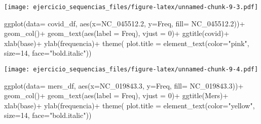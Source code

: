 \documentclass[
]{article}
\newenvironment{Shaded}{\begin{snugshade}}{\end{snugshade}}
\newcommand{\AttributeTok}[1]{\textcolor[rgb]{0.77,0.63,0.00}{#1}}
\newcommand{\DecValTok}[1]{\textcolor[rgb]{0.00,0.00,0.81}{#1}}
\newcommand{\FloatTok}[1]{\textcolor[rgb]{0.00,0.00,0.81}{#1}}
\newcommand{\FunctionTok}[1]{\textcolor[rgb]{0.00,0.00,0.00}{#1}}
\newcommand{\NormalTok}[1]{#1}
\newcommand{\SpecialCharTok}[1]{\textcolor[rgb]{0.00,0.00,0.00}{#1}}
\newcommand{\StringTok}[1]{\textcolor[rgb]{0.31,0.60,0.02}{#1}}
\begin{document}
\texttt{[image: ejercicio\_sequencias\_files/figure-latex/unnamed-chunk-9-3.pdf]}

\begin{Shaded}
\begin{Highlighting}[]
\FunctionTok{ggplot}\NormalTok{(}\AttributeTok{data=}\NormalTok{ covid\_df, }\FunctionTok{aes}\NormalTok{(}\AttributeTok{x=}\NormalTok{NC\_045512}\FloatTok{.2}\NormalTok{, }\AttributeTok{y=}\NormalTok{Freq, }\AttributeTok{fill=}\NormalTok{ NC\_045512}\FloatTok{.2}\NormalTok{))}\SpecialCharTok{+}
   \FunctionTok{geom\_col}\NormalTok{()}\SpecialCharTok{+}
   \FunctionTok{geom\_text}\NormalTok{(}\FunctionTok{aes}\NormalTok{(}\AttributeTok{label =}\NormalTok{ Freq), }\AttributeTok{vjust =} \DecValTok{0}\NormalTok{)}\SpecialCharTok{+}
   \FunctionTok{ggtitle}\NormalTok{(}\StringTok{\textquotesingle{}covid\textquotesingle{}}\NormalTok{)}\SpecialCharTok{+}
   \FunctionTok{xlab}\NormalTok{(}\StringTok{\textquotesingle{}base\textquotesingle{}}\NormalTok{)}\SpecialCharTok{+}
   \FunctionTok{ylab}\NormalTok{(}\StringTok{\textquotesingle{}frequencia\textquotesingle{}}\NormalTok{)}\SpecialCharTok{+}
   \FunctionTok{theme}\NormalTok{(}
   \AttributeTok{plot.title =}  \FunctionTok{element\_text}\NormalTok{(}\AttributeTok{color=}\StringTok{"pink"}\NormalTok{, }\AttributeTok{size=}\DecValTok{14}\NormalTok{, }\AttributeTok{face=}\StringTok{"bold.italic"}\NormalTok{))}
\end{Highlighting}
\end{Shaded}

\texttt{[image: ejercicio\_sequencias\_files/figure-latex/unnamed-chunk-9-4.pdf]}

\begin{Shaded}
\begin{Highlighting}[]
\FunctionTok{ggplot}\NormalTok{(}\AttributeTok{data=}\NormalTok{ mers\_df, }\FunctionTok{aes}\NormalTok{(}\AttributeTok{x=}\NormalTok{NC\_019843}\FloatTok{.3}\NormalTok{, }\AttributeTok{y=}\NormalTok{Freq, }\AttributeTok{fill=}\NormalTok{ NC\_019843}\FloatTok{.3}\NormalTok{))}\SpecialCharTok{+}
   \FunctionTok{geom\_col}\NormalTok{()}\SpecialCharTok{+}
   \FunctionTok{geom\_text}\NormalTok{(}\FunctionTok{aes}\NormalTok{(}\AttributeTok{label =}\NormalTok{ Freq), }\AttributeTok{vjust =} \DecValTok{0}\NormalTok{)}\SpecialCharTok{+}
   \FunctionTok{ggtitle}\NormalTok{(}\StringTok{\textquotesingle{}Mers\textquotesingle{}}\NormalTok{)}\SpecialCharTok{+}
   \FunctionTok{xlab}\NormalTok{(}\StringTok{\textquotesingle{}base\textquotesingle{}}\NormalTok{)}\SpecialCharTok{+}
   \FunctionTok{ylab}\NormalTok{(}\StringTok{\textquotesingle{}frequencia\textquotesingle{}}\NormalTok{)}\SpecialCharTok{+}
   \FunctionTok{theme}\NormalTok{(}
   \AttributeTok{plot.title =}  \FunctionTok{element\_text}\NormalTok{(}\AttributeTok{color=}\StringTok{"yellow"}\NormalTok{, }\AttributeTok{size=}\DecValTok{14}\NormalTok{, }\AttributeTok{face=}\StringTok{"bold.italic"}\NormalTok{))}
\end{Highlighting}
\end{Shaded}
\end{document}
